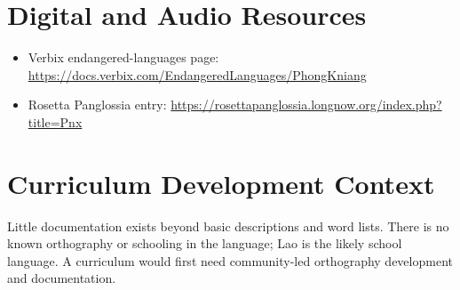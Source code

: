 \documentclass[12pt]{article}
\begin{document}
\section{Digital and Audio Resources}
\begin{itemize}
\item Verbix endangered-languages page: \url{https://docs.verbix.com/EndangeredLanguages/PhongKniang}
\item Rosetta Panglossia entry: \url{https://rosettapanglossia.longnow.org/index.php?title=Pnx}
\end{itemize}

\section{Curriculum Development Context}
Little documentation exists beyond basic descriptions and word lists. There is no known orthography or schooling in the language; Lao is the likely school language. A curriculum would first need community-led orthography development and documentation.
\end{document}
